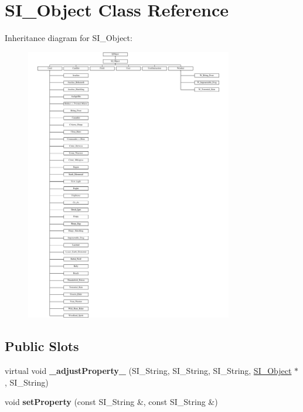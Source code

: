 \hypertarget{class_s_i___object}{}\section{S\+I\+\_\+\+Object Class Reference}
\label{class_s_i___object}
Inheritance diagram for S\+I\+\_\+\+Object\+:\begin{figure}[H]
\begin{center}
\leavevmode
\includegraphics[height=12.000000cm]{class_s_i___object}
\end{center}
\end{figure}
\subsection*{Public Slots}
\begin{DoxyCompactItemize}
\item 
\mbox{\label{class_s_i___object_a9c997aa5f9bc1670872e7a59b3dddd93}} 
virtual void {\bfseries \+\_\+adjust\+Property\+\_\+} (S\+I\+\_\+\+String, S\+I\+\_\+\+String, S\+I\+\_\+\+String, \hyperlink{class_s_i___object}{S\+I\+\_\+\+Object} $\ast$, S\+I\+\_\+\+String)
\item 
\mbox{\label{class_s_i___object_afa18ebaf13b5ca5de7382ca0950b2016}} 
void {\bfseries set\+Property} (const S\+I\+\_\+\+String \&, const S\+I\+\_\+\+String \&)
\end{DoxyCompactItemize}
